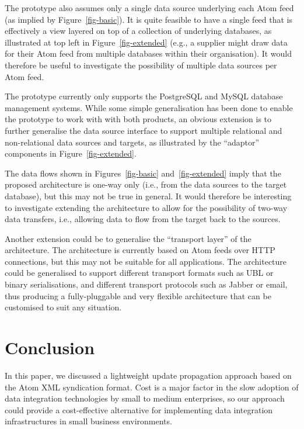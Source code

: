 \documentclass{CRPITStyle}
\begin{document}
The prototype also assumes only a single data source underlying each
Atom feed (as implied by Figure~\ref{fig-basic}). It is quite feasible
to have a single feed that is effectively a view layered on top of a
collection of underlying databases, as illustrated at top left in
Figure~\ref{fig-extended} (e.g., a supplier might draw data for their
Atom feed from multiple databases within their organisation). It would
therefore be useful to investigate the possibility of multiple data
sources per Atom feed.

The prototype currently only supports the PostgreSQL and MySQL database
management systems. While some simple generalisation has been done to
enable the prototype to work with with both products, an obvious
extension is to further generalise the data source interface to support
multiple relational and non-relational data sources and targets, as
illustrated by the ``adaptor'' components in Figure~\ref{fig-extended}.

The data flows shown in Figures~\ref{fig-basic} and~\ref{fig-extended}
imply that the proposed architecture is one-way only (i.e., from the
data sources to the target database), but this may not be true in
general. It would therefore be interesting to investigate extending the
architecture to allow for the possibility of two-way data transfers,
i.e., allowing data to flow from the target back to the sources.

Another extension could be to generalise the ``transport layer'' of the
architecture. The architecture is currently based on Atom feeds over
HTTP connections, but this may not be suitable for all applications. The
architecture could be generalised to support different transport formats
such as UBL or binary serialisations, and different transport protocols
such as Jabber or email, thus producing a fully-pluggable and very
flexible architecture that can be customised to suit any situation.


\section{Conclusion}
\label{sec-conclusion}

In this paper, we discussed a lightweight update propagation approach
based on the Atom XML syndication format. Cost is a major factor in the
slow adoption of data integration technologies by small to medium
enterprises, so our approach could provide a cost-effective alternative
for implementing data integration infrastructures in small business
environments.
\end{document}
